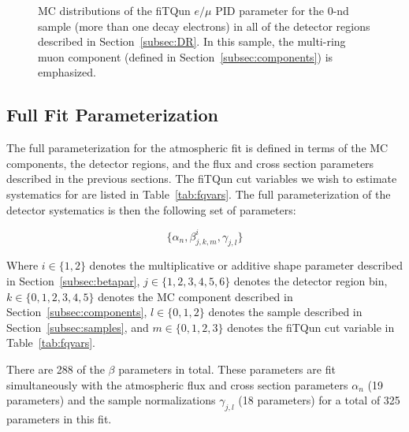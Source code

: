 \begin{figure}[h!]
\begin{tabular}{l  l  l}
\end{tabular} 
\caption{MC distributions of the fiTQun $e/\mu$ PID parameter for the $0$-nd
sample (more than one decay electrons) in all of the detector regions described in
Section~\ref{subsec:DR}.  In this sample, the multi-ring muon component
(defined in Section~\ref{subsec:components}) is emphasized.}
\end{figure}
\FloatBarrier




\subsection{Full Fit Parameterization}
\label{subsec:fullpars}

The full parameterization for the atmospheric fit is defined in terms of the MC
components, the detector regions, and the flux and cross section parameters
described in the previous sections.  The fiTQun cut variables we wish to
estimate systematics for are listed in Table~\ref{tab:fqvars}. The full
parameterization of the detector systematics is then the following set of
parameters:

\begin{equation}
  \label{eq:fullpars}
  \{\alpha_{n}, \beta_{j,k,m}^{i}, \gamma_{j,l} \}
\end{equation}

Where $i \in \{1,2\}$ denotes the multiplicative or additive shape parameter
described in Section~\ref{subsec:betapar}, $j \in \{1,2,3,4,5,6\}$ denotes the
detector region bin, $k \in \{0,1,2,3,4,5\}$ denotes the MC component described
in Section~\ref{subsec:components},  $l \in \{0,1,2\}$ denotes the sample
described in Section~\ref{subsec:samples}, and $m \in \{0,1,2,3\}$ denotes the
fiTQun cut variable in Table~\ref{tab:fqvars}. 

There are 288 of the $\beta$ parameters in total.  These parameters are fit
simultaneously with the atmospheric flux and cross section parameters
$\alpha_{n}$ (19 parameters) and the sample normalizations $\gamma_{j,l}$ (18
parameters) for a total of 325 parameters in this fit.



